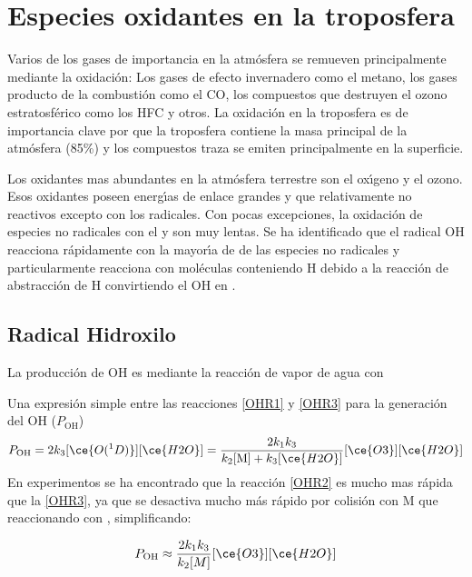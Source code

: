 \section{Especies oxidantes en la troposfera}
Varios de los gases de importancia en la atm\'osfera se remueven principalmente mediante la oxidaci\'on: Los gases de efecto invernadero como el metano, los gases producto de la combusti\'on como el CO, los compuestos que destruyen el ozono estratosf\'erico como los \gls{HFC} y otros. La oxidaci\'on en la troposfera es de importancia clave por que la troposfera contiene la masa principal de la atm\'osfera (85\%) y los compuestos traza se emiten principalmente en la superficie.

Los oxidantes mas abundantes en la atm\'osfera terrestre son el ox\'{\i}geno y el ozono. Esos oxidantes poseen energ\'{\i}as de enlace grandes y que relativamente no reactivos excepto con los radicales. Con pocas excepciones, la oxidaci\'on de especies no radicales con el  y  son muy lentas. Se ha identificado que el radical OH reacciona r\'apidamente con la mayor\'{\i}a de de las especies no radicales y particularmente reacciona con mol\'eculas conteniendo H debido a la reacci\'on de abstracci\'on de H convirtiendo el OH en . 

\subsection{Radical Hidroxilo}

La producci\'on de OH es mediante la reacci\'on de vapor de agua con 


Una expresi\'on simple entre las reacciones \ref{OHR1} y \ref{OHR3}  para la generaci\'on del OH  ($P_\mathrm{OH}$) 
\begin{equation}
P_\mathrm{OH}= 2k_3 [\ce{O(^1D)}] [\ce{H2O}] = \frac{2k_1k_3}{k_2[\mathrm{M]}+k_3[\ce{H2O}]} [\ce{O3}][\ce{H2O}] 
\end{equation}
En experimentos se ha encontrado que la reacci\'on \ref{OHR2} es mucho mas r\'apida que la \ref{OHR3}, ya que  se desactiva mucho m\'as r\'apido por colisi\'on con M que reaccionando con , simplificando:

\begin{equation}
P_\mathrm{OH} \approx  \frac{2k_1k_3}{ k_2[M] } [\ce{O3}]  [\ce{H2O}] 
\end{equation}

